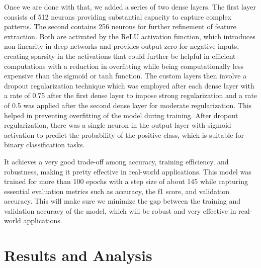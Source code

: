 \documentclass{ieeeaccess}
\begin{document}
Once we are done with that, we added a series of two dense layers. The first layer consists of 512 neurons providing substantial capacity to capture complex patterns. The second contains 256 neurons for further refinement of feature extraction. Both are activated by the ReLU activation function, which introduces non-linearity in deep networks and provides output zero for negative inputs, creating sparsity in the activations that could further be helpful in efficient computations with a reduction in overfitting while being computationally less expensive than the sigmoid or tanh function. The custom layers then involve a dropout regularization technique which was employed after each dense layer with a rate of 0.75 after the first dense layer to impose strong regularization and a rate of 0.5 was applied after the second dense layer for moderate regularization. This helped in preventing overfitting of the model during training. After dropout regularization, there was a single neuron in the output layer with sigmoid activation to predict the probability of the positive class, which is suitable for binary classification tasks.

It achieves a very good trade-off among accuracy, training efficiency, and robustness, making it pretty effective in real-world applications. This model was trained for more than 100 epochs with a step size of about 145 while capturing essential evaluation metrics such as accuracy, the f1 score, and validation accuracy. This will make sure we minimize the gap between the training and validation accuracy of the model, which will be robust and very effective in real-world applications.

\section{Results and Analysis}
\end{document}
